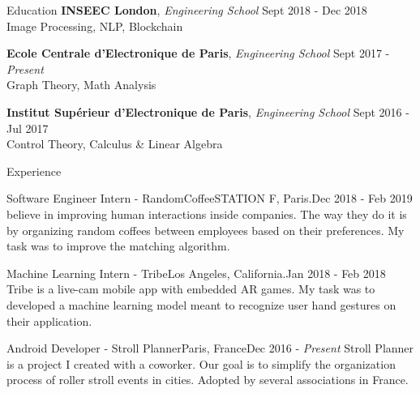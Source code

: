 \documentclass{resume} %
\begin{document}

	\begin{rSection}{Education}
		{\bf INSEEC London}, {\em Engineering School} \hfill {Sept 2018 - Dec 2018}
		\\ Image Processing, NLP, Blockchain

		{\bf Ecole Centrale d'Electronique de Paris}, {\em Engineering School} \hfill {Sept 2017 - \em Present}
		\\ Graph Theory, Math Analysis

		{\bf Institut Supérieur d'Electronique de Paris}, {\em Engineering School} \hfill {Sept 2016 - Jul 2017}
		\\ Control Theory, Calculus \& Linear Algebra
	\end{rSection}



	\begin{rSection}{Experience}
		\begin{event}{Software Engineer Intern - RandomCoffee}{STATION F, Paris.}{Dec 2018 - Feb 2019}{
			 believe in improving human interactions inside companies. The way they do it is by organizing random coffees between employees based on their preferences. My task was to improve the matching algorithm.
		}
		\end{event}

		\begin{event}{Machine Learning Intern - Tribe}{Los Angeles, California.}{Jan 2018 - Feb 2018}{
			Tribe is a live-cam mobile app with embedded AR games. My task was to developed a machine learning model meant to recognize user hand gestures on their application.
		}
		\end{event}

		\begin{event}{Android Developer - Stroll Planner}{Paris, France}{Dec 2016 - \em Present}{
			Stroll Planner is a project I created with a coworker. Our goal is to simplify the organization process of roller stroll events in cities. Adopted by several associations in France. 
		}
		\end{event}
	\end{rSection}
\end{document}
